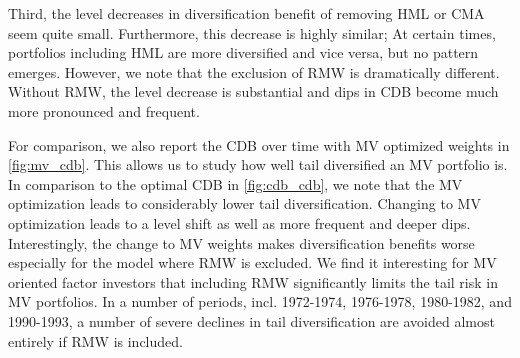 Third, the level decreases in diversification benefit of removing HML or CMA seem quite small. Furthermore, this decrease is highly similar; At certain times, portfolios including HML are more diversified and vice versa, but no pattern emerges. However, we note that the exclusion of RMW is dramatically different. Without RMW, the level decrease is substantial and dips in CDB become much more pronounced and frequent. 

For comparison, we also report the CDB over time with MV optimized weights in \autoref{fig:mv_cdb}. This allows us to study how well tail diversified an MV portfolio is. In comparison to the optimal CDB in \autoref{fig:cdb_cdb}, we note that the MV optimization leads to considerably lower tail diversification. Changing to MV optimization leads to a level shift as well as more frequent and deeper dips. Interestingly, the change to MV weights makes diversification benefits worse especially for the model where RMW is excluded. We find it interesting for MV oriented factor investors that including RMW significantly limits the tail risk in MV portfolios. In a number of periods, incl. 1972-1974, 1976-1978, 1980-1982, and 1990-1993, a number of severe declines in tail diversification are avoided almost entirely if RMW is included. 

